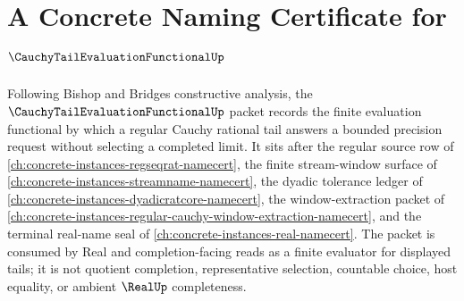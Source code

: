 \chapter{A Concrete Naming Certificate for $\CauchyTailEvaluationFunctionalUp$}
\label{ch:concrete-instances-cauchy-tail-evaluation-functional-namecert}

Following Bishop and Bridges constructive analysis, the $\CauchyTailEvaluationFunctionalUp$ packet records the finite evaluation functional by which a regular Cauchy rational tail answers a bounded precision request without selecting a completed limit. It sits after the regular source row of \autoref{ch:concrete-instances-regseqrat-namecert}, the finite stream-window surface of \autoref{ch:concrete-instances-streamname-namecert}, the dyadic tolerance ledger of \autoref{ch:concrete-instances-dyadicratcore-namecert}, the window-extraction packet of \autoref{ch:concrete-instances-regular-cauchy-window-extraction-namecert}, and the terminal real-name seal of \autoref{ch:concrete-instances-real-namecert}. The packet is consumed by Real and completion-facing reads as a finite evaluator for displayed tails; it is not quotient completion, representative selection, countable choice, host equality, or ambient $\RealUp$ completeness.

